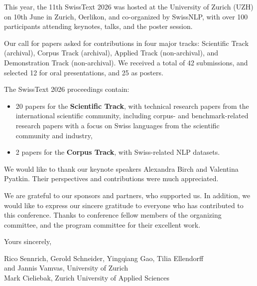 This year, the 11th SwissText 2026 was hosted at the University of Zurich (UZH) on 10th June in Zurich, Oerlikon, and co-organized by SwissNLP, with over 100 participants attending keynotes, talks, and the poster session.

\medskip
 
Our call for papers asked for contributions in four major tracks: Scientific Track (archival), Corpus Track (archival), Applied Track (non-archival), and Demonstration Track (non-archival). We received a total of 42 submissions, and selected 12 for oral presentations, and 25 as posters. 

\medskip

 The SwissText 2026 proceedings contain:
 \begin{itemize}
     \item 20 papers for the \textbf{Scientific Track}, with technical research papers from the international scientific community, including corpus- and benchmark-related research papers with a focus on Swiss languages from the scientific community and industry,
     \item 2 papers for the \textbf{Corpus Track}, with Swiss-related NLP datasets. 
 \end{itemize}  
 
 We would like to thank our keynote speakers Alexandra Birch and Valentina Pyatkin. Their perspectives and contributions were much appreciated.

 \medskip
 
 We are grateful to our sponsors and partners, who supported us. In addition, we would like to express our sincere gratitude to everyone who has contributed to this conference. Thanks to conference fellow members of the organizing committee, and the program committee for their excellent work.
  
 Yours sincerely,\\

 \medskip

 \begin{flushright}
 Rico Sennrich, Gerold Schneider, Yingqiang Gao, Tilia Ellendorff\\and Jannis Vamvas, University of Zurich \\[0.3cm]
  Mark Cieliebak, Zurich University of Applied Sciences
  \end{flushright}
